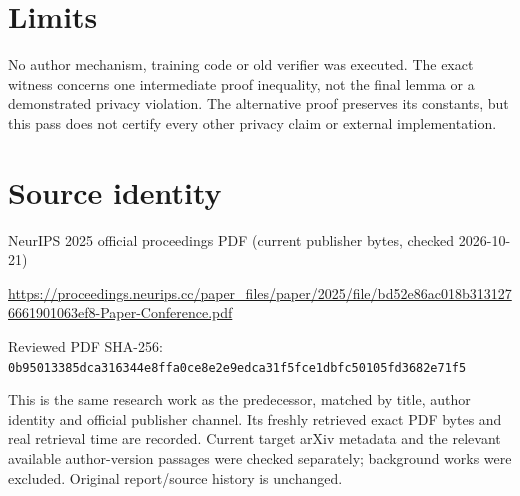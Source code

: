 \documentclass[11pt]{article}
\begin{document}
\section*{Limits}

No author mechanism, training code or old verifier was executed. The exact witness concerns one intermediate proof inequality, not the final lemma or a demonstrated privacy violation. The alternative proof preserves its constants, but this pass does not certify every other privacy claim or external implementation.\par

\section*{Source identity}

NeurIPS 2025 official proceedings PDF (current publisher bytes, checked 2026-10-21)

\url{https://proceedings.neurips.cc/paper_files/paper/2025/file/bd52e86ac018b3131276661901063ef8-Paper-Conference.pdf}

Reviewed PDF SHA-256: \nolinkurl{0b95013385dca316344e8ffa0ce8e2e9edca31f5fce1dbfc50105fd3682e71f5}

This is the same research work as the predecessor, matched by title, author identity and official publisher channel. Its freshly retrieved exact PDF bytes and real retrieval time are recorded. Current target arXiv metadata and the relevant available author-version passages were checked separately; background works were excluded. Original report/source history is unchanged.
\end{document}
